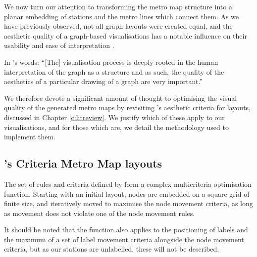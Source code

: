We now turn our attention to transforming the metro map structure into a planar embedding of stations and the metro lines which connect them. As we have previously observed, not all graph layouts were created equal, and the aesthetic quality of a graph-based visualisations has a notable influence on their usability and ease of interpretation \citep{TheBasisForGraphDrawingAlgorithms, WhichAesthetic, AutomaticMetroMapLayoutThesis, AutomaticMetroMapLayout}. 

In \citeauthor{AutomaticMetroMapLayoutThesis}'s words: ``[The] visualisation process is deeply rooted in the human interpretation of the graph as a structure and as such, the quality of the aesthetics of a particular drawing of a graph are very important.'' \citep[p.24]{AutomaticMetroMapLayoutThesis}

We therefore devote a significant amount of thought to optimising the visual quality of the generated metro maps by revisiting \citeauthor{AutomaticMetroMapLayoutThesis}'s aesthetic criteria for layouts, discussed in Chapter \ref{c:litreview}. We justify which of these apply to our visualisations, and for those which are, we detail the methodology used to implement them.

\subsection{\citeauthor{AutomaticMetroMapLayoutThesis}'s Criteria Metro Map layouts} \label{sec:stottapplication}

The set of rules and criteria defined by \cite{AutomaticMetroMapLayoutThesis} form a complex multicriteria optimisation function. Starting with an initial layout, nodes are embedded on a square grid of finite size, and iteratively moved to maximise the node movement criteria, as long as movement does not violate one of the node movement rules.

It should be noted that the function also applies to the positioning of labels and the maximum of a set of label movement criteria alongside the node movement criteria, but as our stations are unlabelled, these will not be described.

